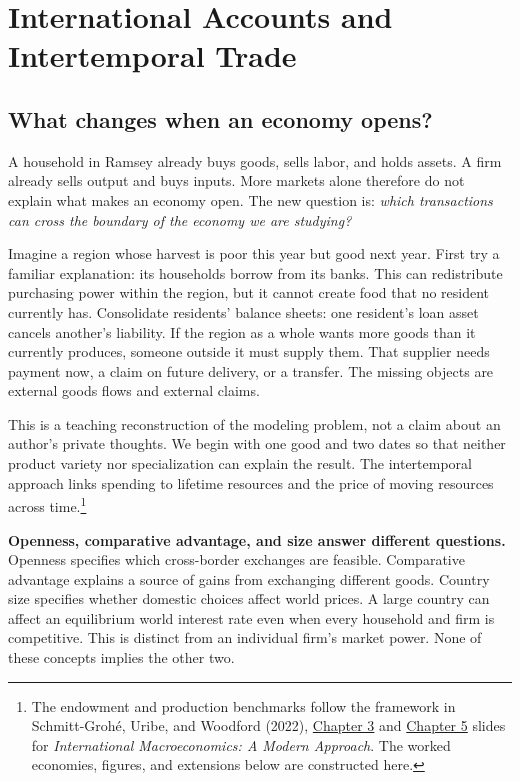 \section{International Accounts and Intertemporal Trade}\label{sec:international-accounts}

\subsection{What changes when an economy opens?}

A household in Ramsey already buys goods, sells labor, and holds assets.
A firm already sells output and buys inputs. More markets alone therefore do
not explain what makes an economy open. The new question is: \emph{which
transactions can cross the boundary of the economy we are studying?}

Imagine a region whose harvest is poor this year but good next year. First
try a familiar explanation: its households borrow from its banks. This can
redistribute purchasing power within the region, but it cannot create food
that no resident currently has. Consolidate residents' balance sheets: one
resident's loan asset cancels another's liability. If the region as a whole
wants more goods than it currently produces, someone outside it must supply
them. That supplier needs payment now, a claim on future delivery, or a transfer.
The missing objects are external goods flows and external claims.

This is a teaching reconstruction of the modeling problem, not a claim about
an author's private thoughts. We begin with one good and two dates so that
neither product variety nor specialization can explain the result. The
intertemporal approach links spending to lifetime resources and the price of
moving resources across time.\footnote{The endowment and production benchmarks
follow the framework in Schmitt-Groh\'e, Uribe, and Woodford (2022),
\href{https://www.columbia.edu/~mu2166/UIM/slides_endowment.pdf}{Chapter 3}
and \href{https://www.columbia.edu/~mu2166/UIM/slides_production.pdf}{Chapter 5}
slides for \textit{International Macroeconomics: A Modern Approach}.
The worked economies, figures, and extensions below are constructed here.}

\begin{blueblock}
\textbf{Openness, comparative advantage, and size answer different questions.}
Openness specifies which cross-border exchanges are feasible. Comparative
advantage explains a source of gains from exchanging different goods.
Country size specifies whether domestic choices affect world prices.
A large country can affect an equilibrium world interest rate even when every
household and firm is competitive. This is distinct from an individual firm's
market power. None of these concepts implies the other two.
\end{blueblock}


